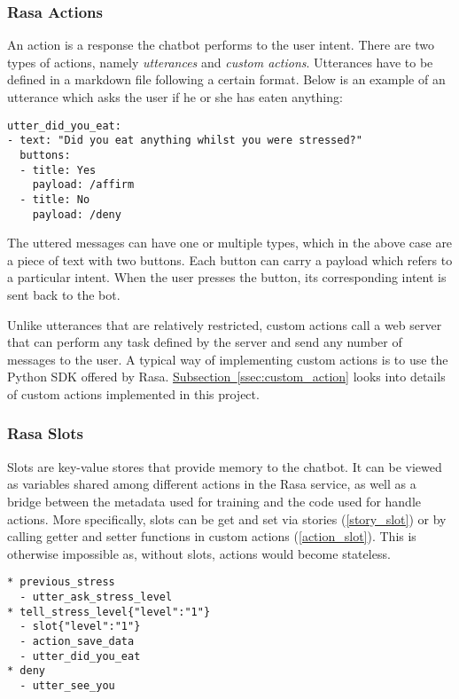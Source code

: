 \bigskip
\subsubsection{Rasa Actions}
An action is a response the chatbot performs to the user intent. There are two types of actions, namely \emph{utterances} and \emph{custom actions}. Utterances have to be defined in a markdown file following a certain format. Below is an example of an utterance which asks the user if he or she has eaten anything:\bigskip

\begin{lstlisting}
utter_did_you_eat:
- text: "Did you eat anything whilst you were stressed?"
  buttons:
  - title: Yes
    payload: /affirm
  - title: No
    payload: /deny
\end{lstlisting}

\bigskip
The uttered messages can have one or multiple types, which in the above case are a piece of text with two buttons. Each button can carry a payload which refers to a particular intent. When the user presses the button, its corresponding intent is sent back to the bot.

Unlike utterances that are relatively restricted, custom actions call a web server that can perform any task defined by the server and send any number of messages to the user. A typical way of implementing custom actions is to use the Python SDK offered by Rasa. \hyperref[ssec:custom_action]{Subsection~\ref*{ssec:custom_action}} looks into details of custom actions implemented in this project.

\subsubsection{Rasa Slots}
Slots are key-value stores that provide memory to the chatbot. It can be viewed as variables shared among different actions in the Rasa service, as well as a bridge between the metadata used for training and the code used for handle actions. More specifically, slots can be get and set via stories (\autoref{story_slot}) or by calling getter and setter functions in custom actions (\autoref{action_slot}). This is otherwise impossible as, without slots, actions would become stateless.\bigskip

\begin{lstlisting}[label={story_slot},caption={Using slots in stories to save user's stress level},captionpos=b]
* previous_stress
  - utter_ask_stress_level
* tell_stress_level{"level":"1"}
  - slot{"level":"1"}
  - action_save_data
  - utter_did_you_eat
* deny
  - utter_see_you
\end{lstlisting}

